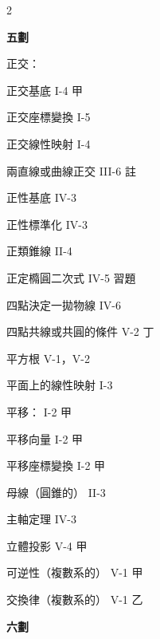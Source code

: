 \begin{multicols}{2}
\vspace{0.8em}
\begin{center}
\textbf{\large 五\quad 劃}
\end{center}

\noindent 正交：\par
\noindent\hspace*{1.5em} 正交基底 \hfill I-4 甲\par
\noindent\hspace*{1.5em} 正交座標變換 \hfill I-5\par
\noindent\hspace*{1.5em} 正交線性映射 \hfill I-4\par
\noindent 兩直線或曲線正交 \hfill III-6 註\par
\noindent 正性基底 \hfill IV-3\par
\noindent 正性標準化 \hfill IV-3\par
\noindent 正類錐線 \hfill II-4\par
\noindent 正定橢圓二次式 \hfill IV-5 習題\par
\noindent 四點決定一拋物線 \hfill IV-6\par
\noindent 四點共線或共圓的條件 \hfill V-2 丁\par
\noindent 平方根 \hfill V-1，V-2\par
\noindent 平面上的線性映射 \hfill I-3\par
\noindent 平移： \hfill I-2 甲\par
\noindent\hspace*{1.5em} 平移向量 \hfill I-2 甲\par
\noindent\hspace*{1.5em} 平移座標變換 \hfill I-2 甲\par
\noindent 母線（圓錐的） \hfill II-3\par
\noindent 主軸定理 \hfill IV-3\par
\noindent 立體投影 \hfill V-4 甲\par
\noindent 可逆性（複數系的） \hfill V-1 甲\par
\noindent 交換律（複數系的） \hfill V-1 乙\par

\vspace{0.8em}
\begin{center}
\textbf{\large 六\quad 劃}
\end{center}


\end{multicols}
